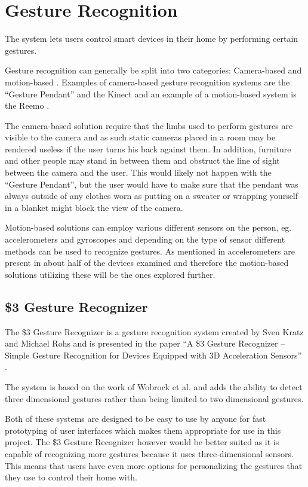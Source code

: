 \section{Gesture Recognition}\label{sec:gesturerecognition}
The system lets users control smart devices in their home by performing certain gestures.

Gesture recognition can generally be split into two categories: Camera-based and motion-based \cite{Kela2006}. Examples of camera-based gesture recognition systems are the ``Gesture Pendant'' \cite{starner2000gesture} and the Kinect \cite{kinect} and an example of a motion-based system is the Reemo \cite{Reemo}.

The camera-based solution require that the limbs used to perform gestures are visible to the camera and as such static cameras placed in a room may be rendered useless if the user turns his back against them. In addition, furniture and other people may stand in between them and obstruct the line of sight between the camera and the user.
This would likely not happen with the ``Gesture Pendant'', but the user would have to make sure that the pendant was always outside of any clothes worn as putting on a sweater or wrapping yourself in a blanket might block the view of the camera.

Motion-based solutions can employ various different sensors on the person, eg. accelerometers and gyroscopes and depending on the type of sensor different methods can be used to recognize gestures.
As mentioned in  accelerometers are present in about half of the devices examined and therefore the motion-based solutions utilizing these will be the ones explored further.

\subsection{\$3 Gesture Recognizer}\label{sec:threedollar}
The \$3 Gesture Recognizer is a gesture recognition system created by Sven Kratz and Michael Rohs and is presented in the paper ``A \$3 Gesture Recognizer – Simple Gesture Recognition for Devices Equipped with 3D Acceleration Sensors'' \cite{threedollar}.

The system is based on the work of Wobrock et al. \cite{wobbrock2007gestures} and adds the ability to detect three dimensional gestures rather than being limited to two dimensional gestures.

Both of these systems are designed to be easy to use by anyone for fast prototyping of user interfaces which makes them appropriate for use in this project.
The \$3 Gesture Recognizer however would be better suited as it is capable of recognizing more gestures because it uses three-dimensional sensors.
This means that users have even more options for personalizing the gestures that they use to control their home with.

